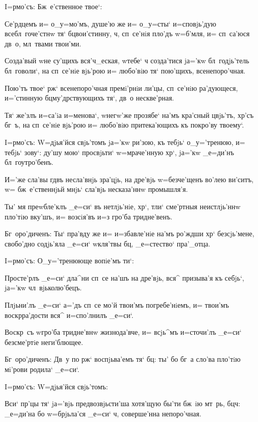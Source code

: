  I=рмо'съ: Бж~е'ственное твое`:

Се'рдцемъ и= о_у=мо'мъ, душе'ю же и= о_у=сты` 
и=сповjь'дую всебл~гоче'стнw тя` бц вои'стинну, 
ч, сп~се'нiя пло'дъ w=б'мля, и= сп~са'юся дв~о, 
мл~твами твои'ми.

Созда'вый w\т не су'щихъ вся'ч_еская, w\т тебе` ч 
созда'тися jа='кw бл~годjь'тель бл~говоли`, на сп~се'нiе 
вjь'рою и= любо'вiю тя` пою'щихъ, всенепоро'чная. 

Пою'тъ твое` рж` всенепоро'чная премi'рнiи ли'цы, 
сп~се'нiю ра'дующеся, и='стинную бц му'дрствующихъ 
тя`, дв~о нескве'рная.

Тя` же'злъ и=са'iа и=менова`, w\т негw'же прозябе` 
на'мъ кра'сный цвjь'тъ, хр'съ бг~ъ, на сп~се'нiе 
вjь'рою и= любо'вiю притека'ющихъ къ покро'ву твоему`.


I=рмо'съ: W=дjья'йся свjь'томъ jа='кw ри'зою, къ 
тебjь` о_у='тренюю, и= тебjь` зову`: ду'шу мою` 
просвjьти` w=мраче'нную хр`, jа='кw _е=ди'нъ 
бл~гоутро'бенъ.

И='же сла'вы гд въ несла'внjь зра'цjь, на дре'вjь 
w=безче'щенъ во'лею ви'ситъ, w= бж~е'ственнjьй мнjь` 
сла'вjь несказа'ннw промышля'я.

Ты' мя преwбле'клъ _е=си` въ нетлjь'нiе, хр`, тли` 
сме'ртныя неистлjь'ннw пло'тiю вку'шъ, и= возсiя'въ и=з\ъ 
гро'ба тридне'венъ.

Бг~оро'диченъ: Ты` пра'вду же и= и=збавле'нiе на'мъ 
ро'ждши хр` без\ъ сjь'мене, свобо'дно содjь'яла 
_е=си` w\т кля'твы бц, _е=стество` пра'_отца. 

 I=рмо'съ: О_у='тренююще вопiе'мъ ти`:

Просте'рлъ _е=си` дла^ни сп~се на'шъ на дре'вjь, вся^ 
призыва'я къ себjь`, jа='кw чл~вjьколю'бецъ.

Плjьни'лъ _е=си` а='дъ сп~се мо'й твои'мъ 
погребе'нiемъ, и= твои'мъ воскр ра'дости вся^ 
и=спо'лнилъ _е=си`.

Воскр~съ w\т гро'ба тридне'внw жизнода'вче, и= всjь^мъ 
и=сточи'лъ _е=си` безсме'ртiе неги'блющее.

Бг~оро'диченъ: Дв~у по рж` воспjьва'емъ тя` 
бц: ты' бо бг~а сло'ва пло'тiю мi'рови родила` _е=си`. 

 I=рмо'съ: W=дjья'йся свjь'томъ:

Вси` пр'цы тя` jа='вjь предвозвjьсти'ша хотя'щую 
бы'ти бж~iю мт~рь, бц ч: _е=ди'на бо w=брjьла'ся 
_е=си` ч, соверше'нна непоро'чная.

